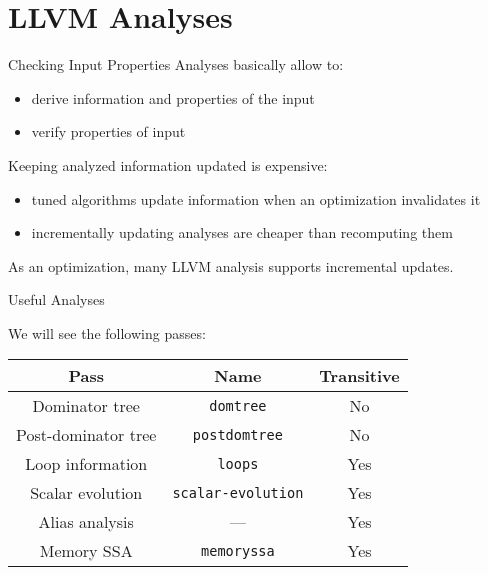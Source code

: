 
\section{LLVM Analyses}


\begin{frame}{Checking Input Properties}
Analyses basically allow to:
\begin{itemize}
\item \alert{derive} information and properties of the input
\item \alert{verify} properties of input
\end{itemize}

\vfill
Keeping analyzed information updated is expensive:
\begin{itemize}
\item tuned algorithms update information when an optimization
      invalidates it
\item incrementally updating analyses are cheaper than recomputing them
\end{itemize}

\vfill
As an \alert{optimization}, many LLVM analysis supports incremental updates.
\end{frame}


\begin{frame}{Useful Analyses}
\begin{center}
We will see the following passes:\\
\bigskip
\begin{tabular}{ccc}
\toprule

\multicolumn{1}{c}{\textbf{Pass}}        &
\multicolumn{1}{c}{\textbf{Name}}      &
\multicolumn{1}{c}{\textbf{Transitive}} \\

\midrule

Dominator tree    &
\texttt{domtree}  &
No               \\

Post-dominator tree   &
\texttt{postdomtree}  &
No                   \\

Loop information  &
\texttt{loops}    &
Yes              \\

Scalar evolution           &
\texttt{scalar-evolution}  &
Yes                       \\

Alias analysis    &
---  &
Yes              \\

Memory SSA  &
\texttt{memoryssa}    &
Yes               \\

\bottomrule
\end{tabular}
\end{center}
\end{frame}


